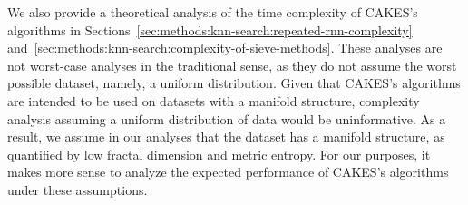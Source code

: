We also provide a theoretical analysis of the time complexity of CAKES's algorithms in Sections~\ref{sec:methods:knn-search:repeated-rnn-complexity} and~\ref{sec:methods:knn-search:complexity-of-sieve-methods}. 
These analyses are not worst-case analyses in the traditional sense, as they do not assume the worst possible dataset, namely, a uniform distribution.
Given that CAKES's algorithms are intended to be used on datasets with a manifold structure, complexity analysis assuming a uniform distribution of data would be uninformative. 
As a result, we assume in our analyses that the dataset has a manifold structure, as quantified by low fractal dimension and metric entropy.
For our purposes, it makes more sense to analyze the expected performance of CAKES's algorithms under these assumptions. 